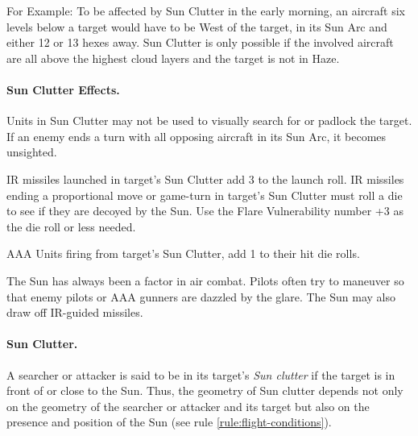 \begin{advancedrules}
{

For Example: To be affected by Sun Clutter in the early morning, an aircraft six levels below a target would have to be West of the target, in its Sun Arc and either 12 or 13 hexes away. Sun Clutter is only possible if the involved aircraft are all above the highest cloud layers and the target is not in Haze.

\paragraph{Sun Clutter Effects.} Units in Sun Clutter may not be used to visually search for or padlock the target. If an enemy ends a turn with all opposing aircraft in its Sun Arc, it becomes unsighted.

IR missiles launched in target's Sun Clutter add 3 to the launch roll. IR missiles ending a proportional move or game-turn in target's Sun Clutter must roll a die to see if they are decoyed by the Sun. Use the Flare Vulnerability number +3 as the die roll or less needed.

AAA Units firing from target's Sun Clutter, add 1 to their hit die rolls.

}{

The Sun has always been a factor in air combat. Pilots often try to maneuver so that enemy pilots or AAA gunners are dazzled by the glare. The Sun may also draw off IR-guided missiles.

\paragraph{Sun Clutter.} 
A searcher or attacker is said to be in its target's \emph{Sun clutter} if the target is in front of or close to the Sun. Thus, the geometry of Sun clutter depends not only on the geometry of the searcher or attacker and its target but also on the presence and position of the Sun (see rule \ref{rule:flight-conditions}).

}
\end{advancedrules}
